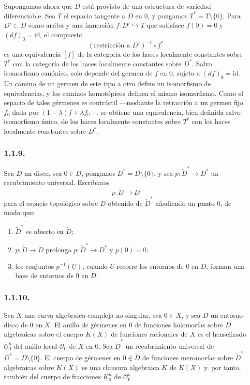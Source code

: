 Supongamos ahora que $D$ está provisto de una estructura de variedad
diferenciable. Sea $T$ el espacio tangente a $D$ en $0$, y pongamos
$T^*=T\setminus\{0\}$. Para $D'\subset D$ como arriba y una inmersión
$f:D'\hookrightarrow T$ que satisface $f(0)=0$ y $(df)_0=\mathrm{id}$, el
compuesto
\[
(\text{restricción a }D')^{-1}\circ f^*
\]
es una equivalencia $[f]$ de la categoría de los haces localmente constantes
sobre $T^*$ con la categoría de los haces localmente constantes sobre $D^*$.
Salvo isomorfismo canónico, solo depende del germen de $f$ en $0$, sujeto a
$(df)_0=\mathrm{id}$. Un camino de un germen de este tipo a otro define un
isomorfismo de equivalencias, y los caminos homotópicos definen el mismo
isomorfismo. Como el espacio de tales gérmenes es contráctil ---mediante la
retracción a un germen fijo $f_0$ dada por
$(1-\lambda)f+\lambda f_0$---, se obtiene una equivalencia, bien definida
salvo isomorfismo único, de los haces localmente constantes sobre $T^*$ con
los haces localmente constantes sobre $D^*$.

\subsubsection*{1.1.9.}
Sea $D$ un disco, sea $0\in D$, pongamos $D^*=D\setminus\{0\}$, y sea
$p:\widetilde D^*\longrightarrow D^*$ un recubrimiento universal. Escribimos
\[
p:\widetilde D\longrightarrow D
\]
para el espacio topológico sobre $D$ obtenido de $\widetilde D^*$ añadiendo
un punto $0$, de modo que:

\pageoriginale

\begin{enumerate}[label=(\alph*),leftmargin=2.6em]
\item $\widetilde D^*$ es abierto en $\widetilde D$;
\item $p:\widetilde D\longrightarrow D$ prolonga
$p:\widetilde D^*\longrightarrow D^*$ y $p(0)=0$;
\item los conjuntos $p^{-1}(U)$, cuando $U$ recorre los entornos de $0$ en
$D$, forman una base de entornos de $0$ en $\widetilde D$.
\end{enumerate}

\subsubsection*{1.1.10.}
Sea $X$ una curva algebraica compleja no singular, sea $0\in X$, y sea $D$
un entorno disco de $0$ en $X$. El anillo de gérmenes en $0$ de funciones
holomorfas sobre $D$ algebraicas sobre el cuerpo $K(X)$ de funciones
racionales de $X$ es el henselizado $\mathcal O_0^h$ del anillo local
$\mathcal O_0$ de $X$ en $0$. Sea $\widetilde D^*$ un recubrimiento universal
de $D^*=D\setminus\{0\}$. El cuerpo de gérmenes en $0\in\widetilde D$ de
funciones meromorfas sobre $\widetilde D^*$ algebraicas sobre $K(X)$ es una
clausura algebraica $\overline K$ de $K(X)$ y, por tanto, también del cuerpo
de fracciones $K_0^h$ de $\mathcal O_0^h$.

